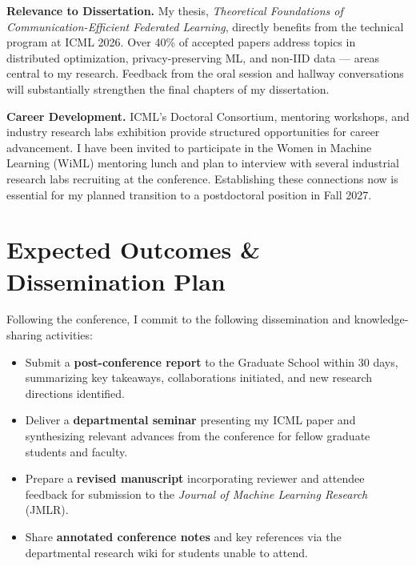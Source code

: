 \documentclass[11pt,letterpaper]{article}
\begin{document}
\vspace{3pt}

\textbf{Relevance to Dissertation.}
My thesis, \textit{Theoretical Foundations of Communication-Efficient Federated Learning}, directly benefits from the technical program at ICML 2026. Over 40\% of accepted papers address topics in distributed optimization, privacy-preserving ML, and non-IID data --- areas central to my research. Feedback from the oral session and hallway conversations will substantially strengthen the final chapters of my dissertation.

\vspace{3pt}

\textbf{Career Development.}
ICML's Doctoral Consortium, mentoring workshops, and industry research labs exhibition provide structured opportunities for career advancement. I have been invited to participate in the Women in Machine Learning (WiML) mentoring lunch and plan to interview with several industrial research labs recruiting at the conference. Establishing these connections now is essential for my planned transition to a postdoctoral position in Fall 2027.

\vspace{2pt}

\section{\faChartBar\hspace{7pt}Expected Outcomes \& Dissemination Plan}

Following the conference, I commit to the following dissemination and knowledge-sharing activities:

\begin{itemize}
  \item Submit a \textbf{post-conference report} to the Graduate School within 30 days, summarizing key takeaways, collaborations initiated, and new research directions identified.
  \item Deliver a \textbf{departmental seminar} presenting my ICML paper and synthesizing relevant advances from the conference for fellow graduate students and faculty.
  \item Prepare a \textbf{revised manuscript} incorporating reviewer and attendee feedback for submission to the \textit{Journal of Machine Learning Research} (JMLR).
  \item Share \textbf{annotated conference notes} and key references via the departmental research wiki for students unable to attend.
\end{itemize}
\end{document}
